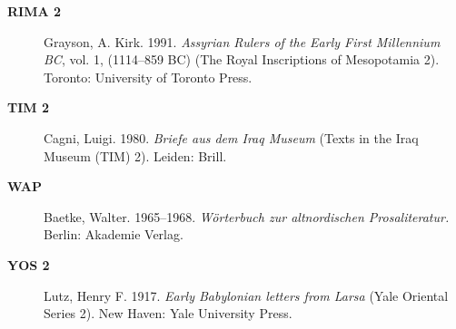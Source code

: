 \begin{description}
\item[\bfseries\upshape RIMA 2]Grayson, A. Kirk. 1991. \emph{Assyrian Rulers of the Early First Millennium BC}, vol. 1, (1114–859 BC) (The Royal Inscriptions of Mesopotamia 2). Toronto: University of Toronto Press.
\item[\bfseries\upshape TIM 2]Cagni, Luigi. 1980. \emph{Briefe aus dem Iraq Museum} (Texts in the Iraq Museum (TIM) 2). Leiden: Brill.
\item[\bfseries\upshape WAP]Baetke, Walter. 1965–1968. \emph{Wörterbuch zur altnordischen Prosaliteratur.} Berlin: Akademie Verlag.
\item[\bfseries\upshape YOS 2]Lutz, Henry F. 1917. \emph{Early Babylonian letters from Larsa} (Yale Oriental Series 2). New Haven: Yale University Press.
\end{description}
\cleardoublepage

%
  
{}
\ohead{\lsSubjectIndexTitle}
\printindex[sbj]
\ohead{}

{}
\printindex[wan]
\ohead{}




